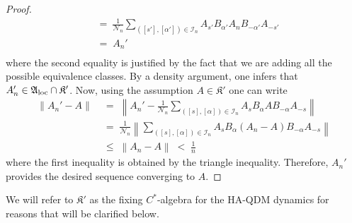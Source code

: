 \documentclass[a4paper,12pt,twoside,reqno]{amsart}
\theoremstyle{plain}
\theoremstyle{definition}
\theoremstyle{remark}
\numberwithin{equation}{section}
\numberwithin{figure}{section}
\numberwithin{table}{section}
\def\norm#1{\left\|#1\right\|}
\begin{document}
\begin{proof}
\begin{align*}
			&=\:\frac{1}{\mathcal{N}_n}\sum_{([s'],[\alpha'])\in \mathcal{I}_n  }A_{s'}B_{\alpha'}A_nB_{-\alpha'}A_{-s'}\\
			&=\;A_n'\\
		\end{align*} 
		where the second equality is justified by the fact that we are adding all the possible equivalence classes. 
		By a density argument, one infers that 
		$A_n'\in \mathfrak{A}_{\rm loc}\cap \mathfrak{K}'$. Now, using the assumption $A\in\mathfrak{K}'$ one can write
		\begin{align*}
			\norm{A_n'-A}\;&=\;\norm{A_n'-\frac{1}{\mathcal{N}_n}\sum_{([s],[\alpha])\in \mathcal{I}_n  }A_sB_\alpha A B_{-\alpha}A_{-s}}\\
			&=\;\frac{1}{\mathcal{N}_n}\norm{\sum_{([s],[\alpha])\in \mathcal{I}_n  }A_sB_\alpha (A_n-A) B_{-\alpha}A_{-s}}\\
			&\leqslant\;\norm{A_n-A}\;<\;\frac{1}{n}
		\end{align*}
		where the first inequality is obtained by the triangle inequality. Therefore, $A_n'$ provides the desired sequence converging to $A$.
	\end{proof}
	
	
	\medskip
	
	
	
	
	We will refer to $\mathfrak{K}'$ as the fixing $C^*$-algebra
	for the  {HA-QDM dynamics} for reasons that will be clarified below.
	
	\medskip
	
\end{document}
